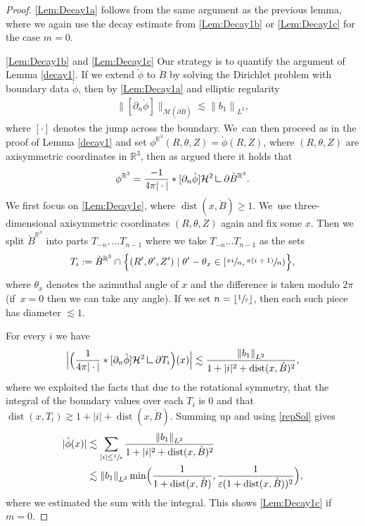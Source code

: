 \documentclass[JEP,XML,SOM,Unicode,published]{cedram}
\let\epsilon\varepsilon
\theoremstyle{definition}
\DeclareMathOperator{\dist}{dist}
\newcommand\R{\mathbb{R}}
\newcommand\norm[1]{\left\lVert #1\right\rVert}
\newcommand\bnorm[1]{\bigl\lVert #1\bigr\rVert}
\newcommand\eq{=}
\newcommand{\mres}{\mathbin{\vrule height 1.6ex depth 0pt width
0.13ex\vrule height 0.13ex depth 0pt width 1.3ex}}
\let\de\partial
\let\eps\epsilon
\begin{document}
\begin{proof}
\eqref{Lem:Decay1a} follows from the same argument as the previous lemma, where we again use the decay estimate from \eqref{Lem:Decay1b} or \eqref{Lem:Decay1c} for the case $m=0$.

\eqref{Lem:Decay1b} and \eqref{Lem:Decay1c} Our strategy is to quantify the argument of Lemma \ref{decay1}.
If we extend $\grave{\phi}$ to $\grave{B}$ by solving the Dirichlet problem with boundary data $\grave{\phi}$, then by \eqref{Lem:Decay1a} and elliptic regularity
\begin{align*}
\bnorm{[\de_n\grave{\phi}]}_{\mathcal{M}(\de \grave{B})}\lesssim \norm{b_1}_{L^2},%
\end{align*}
where $[\cdot]$ denotes the jump across the boundary. We~can then proceed as in the proof of Lemma \ref{decay1} and set $\phi^{\R^3}(R,\theta,Z)=\grave{\phi}(R,Z)$, where $(R,\theta,Z)$ are axisymmetric coordinates in $\R^3$, then as argued there it holds that
\begin{align}
\phi^{\R^3}\eq\frac{-1}{4\pi|\cdot|}*[\de_n\grave{\phi}]\mathcal{H}^2\mres\de\grave{B}^{\R^3}.\label{repSol}
\end{align}
We first focus on \eqref{Lem:Decay1c}, where $\dist(x,\grave{B})\geq 1$. We~use three-dimensional axisymmetric coordinates $(R,\theta,Z)$ again and fix some $x$. Then we split $\grave{B}^{\R^3}$ into parts $T_{-n},\dots T_{n-1}$ where we take $T_{-n}\dots T_{n-1}$ as the sets
\begin{align*}
T_i:=\grave{B}^{\R^3}\cap\Bigl\{(R',\theta',Z')\mid\theta'-\theta_x\in \left[\sfrac{\pi i}{n},\sfrac{\pi(i+1)}{n}\right)\Bigr\},
\end{align*}
where $\theta_x$ denotes the azimuthal angle of $x$ and the difference is taken modulo $2\pi$ (if~$x=0$ then we can take any angle).
If we set $n=\lfloor\sfrac{1}{\eps}\rfloor$, then each such piece has diameter $\lesssim 1$.

For every $i$ we have
\begin{align*}
\Bigl|\Bigl(\frac{1}{4\pi|\cdot|}*[\de_n\grave{\phi}]\mathcal{H}^2\mres\de T_i\Bigr)(x)\Bigr|\lesssim \frac{\norm{b_1}_{L^2}}{1+|i|^2+\dist(x,\hat{B})^2},
\end{align*}
where we exploited the facts that due to the rotational symmetry, that the integral of the boundary values over each $T_i$ is $0$ and that $\dist(x,T_i)\gtrsim1+ |i|+\dist(x,\grave{B})$. Summing up and using \eqref{repSol} gives
\begin{align*}
|\grave{\phi}(x)|&\lesssim \sum_{|i|\leq\sfrac{1}{\eps}}\frac{\norm{b_1}_{L^2}}{1+|i|^2+\dist(x,\grave{B})^2}\\
&\lesssim \norm{b_1}_{L^2}\min\Bigl(\frac{1}{1+\dist(x,\grave{B})},\frac{1}{\eps(1+\dist(x,\grave{B}))^2}\Bigr),
\end{align*}
where we estimated the sum with the integral. This shows \eqref{Lem:Decay1c} if $m=0$.


\end{proof}
\end{document}
